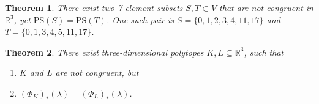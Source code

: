 \documentclass[10pt,a4paper]{amsart}
\newtheorem{theorem}{Theorem}
\begin{document}
\begin{theorem}\label{thm:nonuniq}
There exist two 7-element subsets $S,T\subset V$ that are not congruent in $\mathbb{R}^3$, yet $\mathrm{PS}(S)=\mathrm{PS}(T)$. One such pair is $S=\{0,1,2,3,4,11,17\}$ and $T=\{0,1,3,4,5,11,17\}$.
\end{theorem}

\begin{theorem}\label{thm:convex-bodies}
There exist three-dimensional polytopes $K,L \subseteq \mathbb R^3$, such that
\begin{enumerate}
\item $K$ and $L$ are not congruent, but
\item $(\Phi_K)_*(\lambda) = (\Phi_L)_*(\lambda)$.
\end{enumerate}
\end{theorem}
\end{document}
